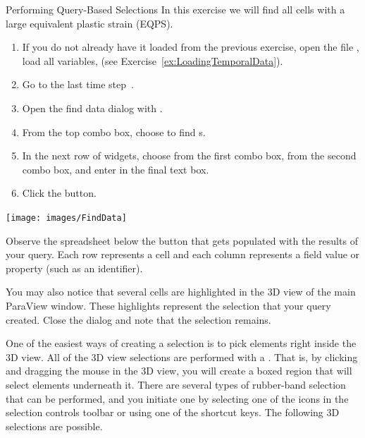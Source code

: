 \begin{exercise}{Performing Query-Based Selections}
  \label{ex:PerformingQueryBasedSelections}%
  In this exercise we will find all cells with a large equivalent plastic
  strain (EQPS).

  \begin{enumerate}
  \item If you do not already have it loaded from the previous exercise,
    open the file , load all variables, \apply (see
    Exercise~\ref{ex:LoadingTemporalData}).
  \item Go to the last time step~\vcrLast.
  \item Open the find data dialog with  \ra {}.
  \item From the top combo box, choose to find s.
  \item In the next row of widgets, choose  from the first combo
    box,  from the second combo box, and enter  in the
    final text box.
  \item Click the  button.
  \end{enumerate}

  \begin{inlinefig}
    \texttt{[image: images/FindData]}
  \end{inlinefig}

  Observe the spreadsheet below the  button that
  gets populated with the results of your query.  Each row represents a
  cell and each column represents a field value or property (such as an
  identifier).

  You may also notice that several cells are highlighted in the 3D view of
  the main ParaView window.  These highlights represent the selection that
  your query created.  Close the  dialog and note that the
  selection remains.
\end{exercise}

One of the easiest ways of creating a selection is to pick elements right
inside the 3D view.  All of the 3D view selections are performed with a
.  That is, by clicking and dragging the
mouse in the 3D view, you will create a boxed region that will select
elements underneath it.  There are several types of rubber-band selection
that can be performed, and you initiate one by selecting one of the icons
in the selection controls toolbar or using one of the shortcut keys.  The
following 3D selections are possible.

